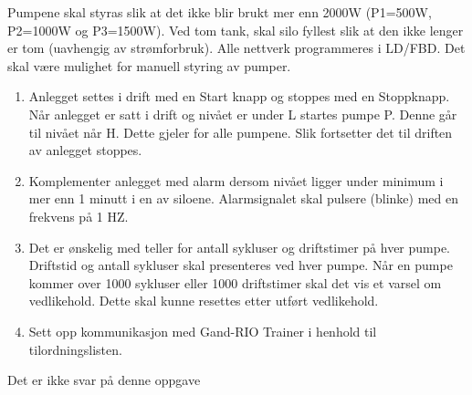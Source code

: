 Pumpene skal styras slik at det ikke blir brukt mer enn 2000W (P1=500W,
P2=1000W og P3=1500W). Ved tom tank, skal silo fyllest slik at den
ikke lenger er tom (uavhengig av strømforbruk). Alle nettverk programmeres
i LD/FBD. Det skal være mulighet for manuell styring av pumper. 
\begin{enumerate}
\item Anlegget settes i drift med en Start knapp og stoppes med en Stoppknapp.
Når anlegget er satt i drift og nivået er under L startes pumpe P.
Denne går til nivået når H. Dette gjeler for alle pumpene. Slik fortsetter
det til driften av anlegget stoppes. 
\item Komplementer anlegget med alarm dersom nivået ligger under minimum
i mer enn 1 minutt i en av siloene. Alarmsignalet skal pulsere (blinke)
med en frekvens på 1 HZ. 
\item Det er ønskelig med teller for antall sykluser og driftstimer på hver
pumpe. Driftstid og antall sykluser skal presenteres ved hver pumpe.
Når en pumpe kommer over 1000 sykluser eller 1000 driftstimer skal
det vis et varsel om vedlikehold. Dette skal kunne resettes etter
utført vedlikehold. 
\item Sett opp kommunikasjon med Gand-RIO Trainer i henhold til tilordningslisten.
\end{enumerate}





Det er ikke svar på denne oppgave












